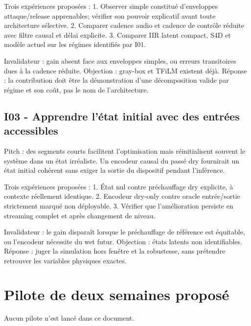 \documentclass[10pt,a4paper]{article}
\begin{document}
Trois exp\'{e}riences propos\'{e}es :
1. Observer simple constitu\'{e} d'enveloppes attaque/release apprenables; v\'{e}rifier son pouvoir
   explicatif avant toute architecture s\'{e}lective.
2. Comparer cadence audio et cadence de contr\^{o}le r\'{e}duite avec filtre causal et d\'{e}lai explicite.
3. Comparer IIR latent compact, S4D et mod\`{e}le actuel sur les r\'{e}gimes identifi\'{e}s par I01.

Invalidateur : gain absent face aux enveloppes simples, ou erreurs transitoires dues \`{a} la cadence
r\'{e}duite. Objection : gray-box et TFiLM existent d\'{e}j\`{a}. R\'{e}ponse : la contribution doit \^{e}tre la
d\'{e}monstration d'une d\'{e}composition valide par r\'{e}gime et son co\^{u}t, pas le nom de l'architecture.

\subsection{I03 - Apprendre l'\'{e}tat initial avec des entr\'{e}es accessibles}

Pitch : des segments courts facilitent l'optimisation mais r\'{e}initialisent souvent le syst\`{e}me
dans un \'{e}tat irr\'{e}aliste. Un encodeur causal du pass\'{e} dry fournirait un \'{e}tat initial coh\'{e}rent
sans exiger la sortie du dispositif pendant l'inf\'{e}rence.

Trois exp\'{e}riences propos\'{e}es :
1. \'{E}tat nul contre pr\'{e}chauffage dry explicite, \`{a} contexte r\'{e}ellement identique.
2. Encodeur dry-only contre oracle entr\'{e}e/sortie strictement marqu\'{e} non d\'{e}ployable.
3. V\'{e}rifier que l'am\'{e}lioration persiste en streaming complet et apr\`{e}s changement de niveau.

Invalidateur : le gain dispara\^{i}t lorsque le pr\'{e}chauffage de r\'{e}f\'{e}rence est \'{e}quitable, ou l'encodeur
n\'{e}cessite du wet futur. Objection : \'{e}tats latents non identifiables. R\'{e}ponse : juger la simulation
hors fen\^{e}tre et la robustesse, sans pr\'{e}tendre retrouver les variables physiques exactes.

\section{Pilote de deux semaines propos\'{e}}

Aucun pilote n'est lanc\'{e} dans ce document.
\end{document}
